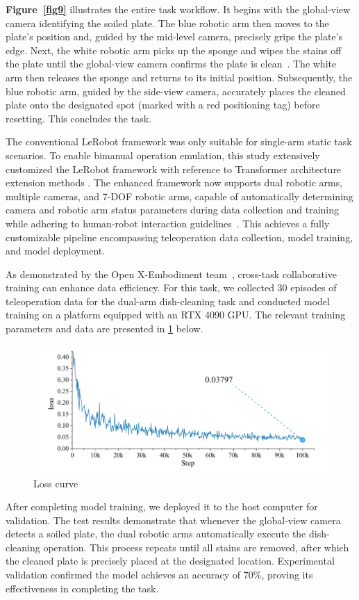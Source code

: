 \documentclass[runningheads]{llncs}
\begin{document}
\textbf{Figure~\ref{fig9}} illustrates the entire task workflow. It begins with the global-view camera identifying the soiled plate. The blue robotic arm then moves to the plate's position and, guided by the mid-level camera, precisely grips the plate's edge. Next, the white robotic arm picks up the sponge and wipes the stains off the plate until the global-view camera confirms the plate is clean~\cite{fu_deep_2022}. The white arm then releases the sponge and returns to its initial position. Subsequently, the blue robotic arm, guided by the side-view camera, accurately places the cleaned plate onto the designated spot (marked with a red positioning tag) before resetting. This concludes the task.


The conventional LeRobot framework was only suitable for single-arm static task scenarios. To enable bimanual operation emulation, this study extensively customized the LeRobot framework with reference to Transformer architecture extension methods . The enhanced framework now supports dual robotic arms, multiple cameras, and 7-DOF robotic arms, capable of automatically determining camera and robotic arm status parameters during data collection and training while adhering to human-robot interaction guidelines~\cite{ref15}. This achieves a fully customizable pipeline encompassing teleoperation data collection, model training, and model deployment.


As demonstrated by the Open X-Embodiment team~\cite{ref16}, cross-task collaborative training can enhance data efficiency. For this task, we collected 30 episodes of teleoperation data for the dual-arm dish-cleaning task and conducted model training on a platform equipped with an RTX 4090 GPU. The relevant training parameters and data are presented in \cref{fig19} below.


\begin{figure}
\centering
\includegraphics[width=323pt]{fig8.pdf}
\caption{Loss curve} \label{fig19}
\end{figure}


After completing model training, we deployed it to the host computer for validation. The test results demonstrate that whenever the global-view camera detects a soiled plate, the dual robotic arms automatically execute the dish-cleaning operation. This process repeats until all stains are removed, after which the cleaned plate is precisely placed at the designated location. Experimental validation confirmed the model achieves an accuracy of 70\%, proving its effectiveness in completing the task.
\end{document}
